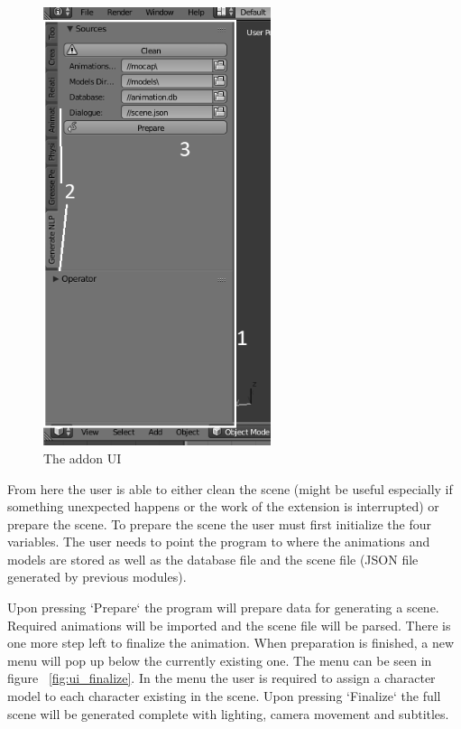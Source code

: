 \begin{figure}[!ht]
\centerline{\includegraphics[width = 18em]{img/ui_main.png}}
\caption{The addon UI}\label{fig:ui_main}
\end{figure}

From here the user is able to either clean the scene (might be useful especially if something unexpected happens or the work of the extension is interrupted) or prepare the scene. To prepare the scene the user must first initialize the four variables. The user needs to point the program to where the animations and models are stored as well as the database file and the scene file (JSON file generated by previous modules).

Upon pressing `Prepare` the program will prepare data for generating a scene. Required animations will be imported and the scene file will be parsed. There is one more step left to finalize the animation. When preparation is finished, a new menu will pop up below the currently existing one. The menu can be seen in figure ~\ref{fig:ui_finalize}. In the menu the user is required to assign a character model to each character existing in the scene. Upon pressing `Finalize` the full scene will be generated complete with lighting, camera movement and subtitles.

